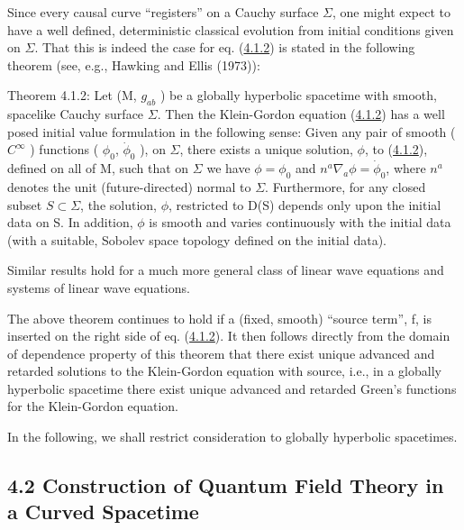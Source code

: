 \documentclass[11pt,a4paper]{article}
\begin{document}
Since every causal curve ``registers'' on a Cauchy surface \(\Sigma\), one might expect to have a well defined, deterministic classical evolution from initial conditions given on \(\Sigma\). That this is indeed the case for eq. (\hyperref[eq:4.1.2]{4.1.2}) is stated in the following theorem (see, e.g., Hawking and Ellis (1973)):

Theorem 4.1.2: Let (M, \(g_{ab}\) ) be a globally hyperbolic spacetime with smooth, spacelike Cauchy surface \(\Sigma\). Then the Klein-Gordon equation (\hyperref[eq:4.1.2]{4.1.2}) has a well posed initial value formulation in the following sense: Given any pair of smooth ( \(C^{\infty}\) ) functions ( \(\phi_0\), \(\dot{\phi}_0\) ), on \(\Sigma\), there exists a unique solution, \(\phi\), to (\hyperref[eq:4.1.2]{4.1.2}), defined on all of M, such that on \(\Sigma\) we have \(\phi = \phi_0\) and \(n^a \nabla_a \phi = \dot{\phi}_0\), where \(n^a\) denotes the unit (future-directed) normal to \(\Sigma\). Furthermore, for any closed subset \(S \subset \Sigma\), the solution, \(\phi\), restricted to D(S) depends only upon the initial data on S. In addition, \(\phi\) is smooth and varies continuously with the initial data (with a suitable, Sobolev space topology defined on the initial data).

Similar results hold for a much more general class of linear wave equations and systems of linear wave equations.

The above theorem continues to hold if a (fixed, smooth) ``source term'', f, is inserted on the right side of eq. (\hyperref[eq:4.1.2]{4.1.2}). It then follows directly from the domain of dependence property of this theorem that there exist unique advanced and retarded solutions to the Klein-Gordon equation with source, i.e., in a globally hyperbolic spacetime there exist unique advanced and retarded Green's functions for the Klein-Gordon equation.

In the following, we shall restrict consideration to globally hyperbolic spacetimes.

\hypertarget{source-70}{}
\subsection*{4.2 Construction of Quantum Field Theory in a Curved Spacetime}\hypertarget{sec:4.2}{}
\end{document}
